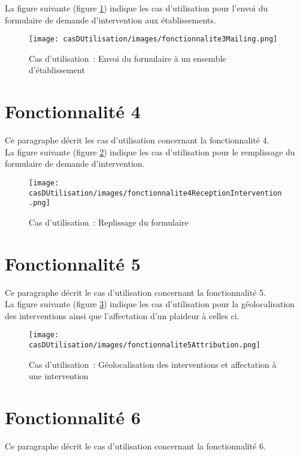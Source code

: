 La figure suivante (figure \ref{diagrammeCasUtilisation3}) indique les cas d'utilisation pour l'envoi du formulaire de demande d'intervention aux établissements.
\begin{figure}[H]
	\centering
	\texttt{[image: casDUtilisation/images/fonctionnalite3Mailing.png]}
	\caption{Cas d'utilisation~: Envoi du formulaire à un ensemble d'établissement}
	\label{diagrammeCasUtilisation3}
\end{figure}

\section{Fonctionnalité 4}
Ce paragraphe décrit les cas d'utilisation concernant la fonctionnalité 4. \\

La figure suivante (figure \ref{diagrammeCasUtilisation4}) indique les cas d'utilisation pour le remplissage du formulaire de demande d'intervention.
\begin{figure}[H]
	\centering
	\texttt{[image: casDUtilisation/images/fonctionnalite4ReceptionIntervention.png]}
	\caption{Cas d'utilisation~: Replissage du formulaire}
	\label{diagrammeCasUtilisation4}
\end{figure}

\section{Fonctionnalité 5}
Ce paragraphe décrit le cas d'utilisation concernant la fonctionnalité 5. \\

La figure suivante (figure \ref{diagrammeCasUtilisation5}) indique les cas d'utilisation pour la géolocalisation des interventions ainsi que l'affectation d'un plaideur à celles ci. \\
\begin{figure}[H]
	\centering
	\texttt{[image: casDUtilisation/images/fonctionnalite5Attribution.png]}
	\caption{Cas d'utilisation~: Géolocalisation des interventions et affectation à une intervention}
	\label{diagrammeCasUtilisation5}
\end{figure}

\section{Fonctionnalité 6}
Ce paragraphe décrit le cas d'utilisation concernant la fonctionnalité 6. \\

